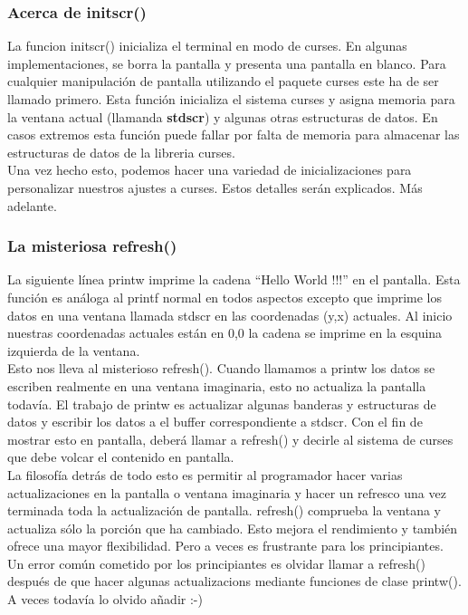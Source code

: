 \documentclass{article}
\begin{document}
\subsubsection{Acerca de initscr()}%
La funcion initscr() inicializa el terminal en modo de curses. En algunas
implementaciones, se borra la pantalla y presenta una pantalla en blanco. Para
cualquier manipulación de pantalla utilizando el paquete curses este ha de ser
llamado primero. Esta función inicializa el sistema curses y asigna memoria
para la ventana actual (llamanda \textbf{stdscr}) y algunas otras estructuras
de datos. En casos extremos esta función puede fallar por falta de memoria
para almacenar las estructuras de datos de la libreria curses.\\

Una vez hecho esto, podemos hacer una variedad de inicializaciones para
personalizar nuestros ajustes a curses. Estos detalles serán explicados. Más
adelante.\\

\subsubsection{La misteriosa refresh()}%
La siguiente línea printw imprime la cadena “Hello World !!!” en el pantalla.
Esta función es análoga al printf normal en todos aspectos excepto que imprime
los datos en una ventana llamada stdscr en las coordenadas (y,x) actuales. Al
inicio nuestras coordenadas actuales están en 0,0 la cadena se imprime en la
esquina izquierda de la ventana.\\

Esto nos lleva al misterioso refresh(). Cuando llamamos a printw los datos se
escriben realmente en una ventana imaginaria, esto no actualiza la pantalla
todavía. El trabajo de printw es actualizar algunas banderas y estructuras de
datos y escribir los datos a el buffer correspondiente a stdscr. Con el fin de
mostrar esto en pantalla, deberá llamar a refresh() y decirle al sistema de
curses que debe volcar el contenido en pantalla.\\

La filosofía detrás de todo esto es permitir al programador hacer varias
actualizaciones en la pantalla o ventana imaginaria y hacer un refresco una vez
terminada toda la actualización de pantalla. refresh() comprueba la ventana y
actualiza sólo la porción que ha cambiado. Esto mejora el rendimiento y también
ofrece una mayor flexibilidad. Pero a veces es frustrante para los
principiantes. Un error común cometido por los principiantes es olvidar llamar
a refresh() después de que hacer algunas actualizacions mediante funciones de
clase printw(). A veces todavía lo olvido añadir :-)\\
\end{document}
